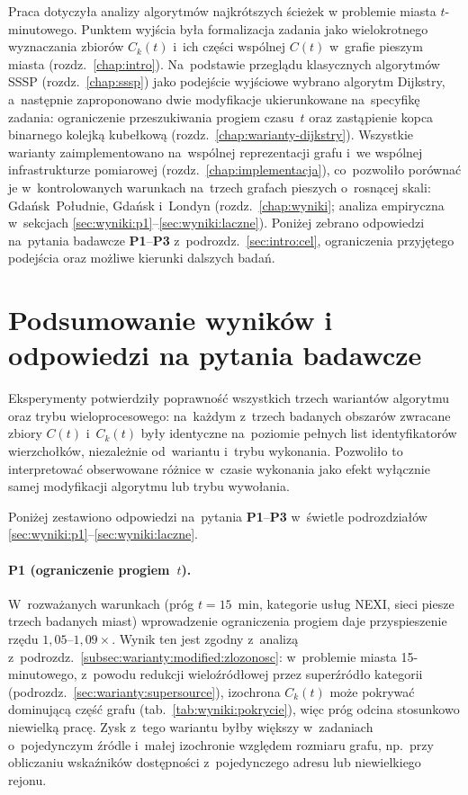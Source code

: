 \label{chap:podsumowanie}

Praca dotyczyła analizy algorytmów najkrótszych ścieżek w problemie miasta
$t$-minutowego. Punktem wyjścia była formalizacja zadania jako wielokrotnego
wyznaczania zbiorów $C_k(t)$ i~ich części wspólnej $C(t)$ w~grafie pieszym
miasta (rozdz.~\ref{chap:intro}). Na~podstawie przeglądu klasycznych
algorytmów SSSP (rozdz.~\ref{chap:sssp}) jako podejście wyjściowe wybrano
algorytm Dijkstry, a~następnie zaproponowano dwie modyfikacje ukierunkowane
na~specyfikę zadania: ograniczenie przeszukiwania progiem czasu~$t$ oraz
zastąpienie kopca binarnego kolejką kubełkową
(rozdz.~\ref{chap:warianty-dijkstry}). Wszystkie warianty zaimplementowano
na~wspólnej reprezentacji grafu i~we wspólnej infrastrukturze pomiarowej
(rozdz.~\ref{chap:implementacja}), co~pozwoliło porównać je w~kontrolowanych
warunkach na~trzech grafach pieszych o~rosnącej skali: Gdańsk~Południe,
Gdańsk i~Londyn (rozdz.~\ref{chap:wyniki}; analiza empiryczna w~sekcjach
\ref{sec:wyniki:p1}--\ref{sec:wyniki:laczne}). Poniżej zebrano
odpowiedzi na~pytania badawcze \textbf{P1}--\textbf{P3} z~podrozdz.~\ref{sec:intro:cel},
ograniczenia przyjętego podejścia oraz możliwe kierunki dalszych badań.

\section{Podsumowanie wyników i odpowiedzi na pytania badawcze}
\label{sec:podsum:odpowiedzi}

Eksperymenty potwierdziły poprawność wszystkich trzech wariantów algorytmu
oraz trybu wieloprocesowego: na~każdym z~trzech badanych obszarów zwracane
zbiory $C(t)$ i~$C_k(t)$ były identyczne na~poziomie pełnych list
identyfikatorów wierzchołków, niezależnie od~wariantu i~trybu wykonania.
Pozwoliło to interpretować obserwowane różnice w~czasie wykonania jako
efekt wyłącznie samej modyfikacji algorytmu lub trybu wywołania.

Poniżej zestawiono odpowiedzi na~pytania \textbf{P1}--\textbf{P3}
w~świetle podrozdziałów \ref{sec:wyniki:p1}--\ref{sec:wyniki:laczne}.

\clearpage

\paragraph{P1 (ograniczenie progiem~$t$).}
W~rozważanych warunkach (próg $t=15$~min, kategorie usług NEXI, sieci piesze
trzech badanych miast) wprowadzenie ograniczenia progiem daje przyspieszenie
rzędu $1{,}05$--$1{,}09\times$. Wynik ten jest zgodny z~analizą
z~podrozdz.~\ref{subsec:warianty:modified:zlozonosc}: w~problemie miasta
15-minutowego, z~powodu redukcji wieloźródłowej przez superźródło kategorii
(podrozdz.~\ref{sec:warianty:supersource}), izochrona $C_k(t)$ może pokrywać
dominującą część grafu (tab.~\ref{tab:wyniki:pokrycie}), więc próg odcina
stosunkowo niewielką pracę. Zysk z~tego wariantu byłby większy w~zadaniach
o~pojedynczym źródle i~małej izochronie względem rozmiaru grafu, np.\ przy
obliczaniu wskaźników dostępności z~pojedynczego adresu lub niewielkiego
rejonu.

